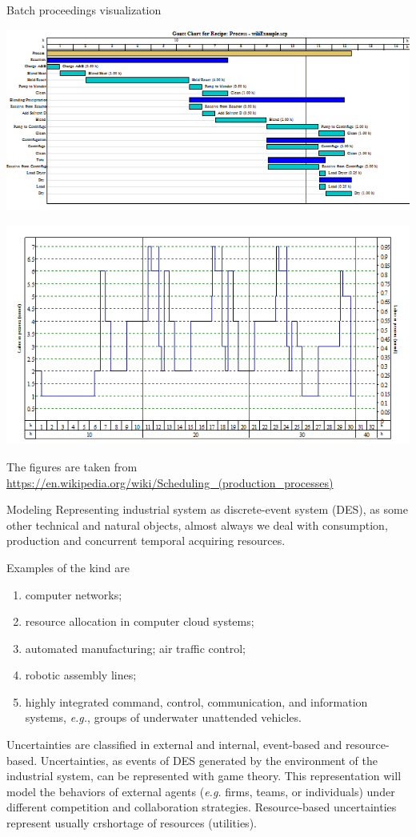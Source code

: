 \documentclass[10pt,dvipsnames]{beamer}
\begin{document}
\begin{frame}{Batch proceedings visualization}

\includegraphics[width=0.7\linewidth]{pics/BatchGantt1.png}

\hfill    \includegraphics[width=0.7\linewidth]{pics/BatchLabor1.png}

    \noindent The figures are taken from \url{https://en.wikipedia.org/wiki/Scheduling_(production_processes)}
\end{frame}


\begin{frame}{Modeling}
  Representing industrial system as discrete-event system (DES), as some other technical and natural objects, almost always we deal with consumption, production and concurrent temporal acquiring resources.

  Examples of the kind are
  \begin{enumerate}
  \item computer networks;
  \item resource allocation in computer cloud systems;
  \item automated manufacturing; air traffic control;
  \item robotic assembly lines;
  \item highly integrated command, control, communication, and information systems, \emph{e.g.}, groups of underwater unattended vehicles.
  \end{enumerate}

  \alert{Uncertainties} are classified in \alert{external} and \alert{internal}, \alert{event-based} and \alert{resource-based}.  Uncertainties, as events of DES generated by the environment of the industrial system, can be represented with game theory.  This representation will model the behaviors of external agents (\emph{e.g.} firms, teams, or individuals) under different \alert{competition} and \alert{collaboration} strategies.  Resource-based uncertainties represent usually crshortage of resources (utilities).
\end{frame}
\end{document}
